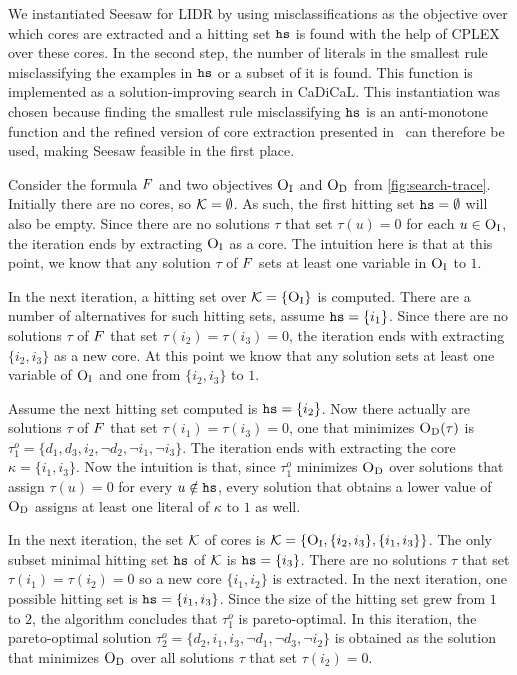 We instantiated Seesaw for LIDR by using misclassifications as the objective over which cores are extracted and a hitting set $\texttt{hs}$ is found with the help of CPLEX over these cores.
In the second step, the number of literals in the smallest rule misclassifying the examples in $\texttt{hs}$ or a subset of it is found.
This function is implemented as a solution-improving search in CaDiCaL.
This instantiation was chosen because finding the smallest rule misclassifying $\texttt{hs}$ is an anti-monotone function and the refined version of core extraction presented in~\textcite{DBLP:conf/cp/JanotaMSM21} can therefore be used, making Seesaw feasible in the first place.

\begin{example}
  Consider the formula $F$ and two objectives $\textsc{O}_{\text{I}}$ and $\textsc{O}_{\text{D}}$ from \cref{fig:search-trace}. 
  Initially there are no cores, so $\mathcal{K} = \emptyset$.
  As such, the first hitting set $\texttt{hs} = \emptyset$ will also be empty.
  Since there are no solutions $\tau$ that set $\tau(u) = 0$ for each $u \in \textsc{O}_{\text{I}}$, the iteration ends by extracting $\textsc{O}_{\text{I}}$ as a core. 
  The intuition here is that at this point, we know that any solution $\tau$ of $F$ sets at least one variable in $\textsc{O}_{\text{I}}$ to $1$.

  In the next iteration, a hitting set over $\mathcal{K} = \{ \textsc{O}_{\text{I}} \}$ is computed. There are a number of alternatives for such hitting sets, assume $\texttt{hs} = \{ i_1 \}$.
  Since there are no solutions $\tau$ of $F$ that set $\tau(i_2) = \tau(i_3) = 0$, the iteration ends with extracting $\{ i_2, i_3\}$ as a new core.
  At this point we know that any solution sets at least one variable of $\textsc{O}_{\text{I}}$ and one from $\{i_2, i_3\}$ to $1$.

  Assume the next hitting set computed is $\texttt{hs} = \{i_2\}$. Now there actually are solutions $\tau$ of $F$ that set $\tau(i_1) = \tau(i_3) = 0$, one that minimizes 
  $\textsc{O}_{\text{D}}(\tau)$ is $\tau^o_1 = \{d_1, d_3, i_2, \lnot d_2, \lnot i_1, \lnot i_3 \}$. The iteration ends with extracting the core
  $\kappa = \{i_1, i_3\}$. Now the intuition is that, since $\tau^o_1$ minimizes $\textsc{O}_{\text{D}}$ over solutions that assign $\tau(u) = 0$ for every $u \notin \texttt{hs}$, every solution that obtains a lower value of $\textsc{O}_{\text{D}}$
  assigns at least one literal of $\kappa$ to $1$ as well. 

  In the next iteration, the set $\mathcal{K}$ of cores is $\mathcal{K} = \{ \textsc{O}_{\text{I}}, \{i_2, i_3\}, \{i_1, i_3\}\}$. The only subset minimal hitting set $\texttt{hs}$ of $\mathcal{K}$ is $\texttt{hs} = \{i_3\}$.
  There are no solutions $\tau$ that set $\tau(i_1) = \tau(i_2) = 0$ so a new core $\{i_1, i_2\}$ is extracted. 
  In the next iteration, one possible hitting set is $\texttt{hs} = \{i_1, i_3\}$. Since the size of the hitting set grew from $1$ to $2$, the algorithm concludes that $\tau^o_1$ is pareto-optimal. 
  In this iteration, the pareto-optimal solution $\tau^o_2 = \{d_2, i_1, i_3, \lnot d_1, \lnot d_3, \lnot i_2 \}$ is obtained 
  as the solution that minimizes $\textsc{O}_{\text{D}}$ over all solutions $\tau$ that set $\tau(i_2) = 0$.  


\end{example}
